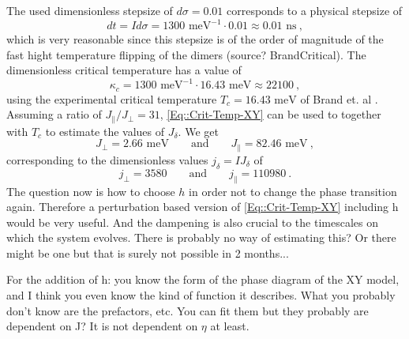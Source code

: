 	The used dimensionless stepsize of $d\sigma = 0.01$ corresponds to a physical stepsize of 
	\begin{equation}
		dt = I d \sigma =	1300 \text{ meV}^{-1} \cdot 0.01 \approx 0.01 \text{ ns}~,	
	\end{equation}
	which is very reasonable since this stepsize is of the order of magnitude of the fast hight temperature flipping of the dimers (source? BrandCritical). The dimensionless critical temperature has a value of
	\begin{equation}
		\kappa_c =	1300 \text{ meV}^{-1} \cdot 16.43 \text{ meV} \approx 22100~,
	\end{equation}
	using the experimental critical temperature $T_c =	16.43 \text{ meV}$ of Brand et. al \cite{brand2023dimer}.
	Assuming a ratio of $J_\parallel /	J_\perp =	31$, \autoref{Eq::Crit-Temp-XY} can be used to together with $T_c$ to estimate the values of $J_\delta$. We get
	\begin{equation}
		J_\perp =	2.66 \text{ meV} \qquad \text{and} \qquad J_\parallel = 82.46 \text{ meV}~,	
	\end{equation}
	corresponding to the dimensionless values $j_\delta =	I J_\delta$ of
	\begin{equation}
		j_\perp =	3580 \qquad \text{and} \qquad j_\parallel =	110980~.
	\end{equation}
	The question now is how to choose $h$ in order not to change the phase transition again. Therefore a perturbation based version of \autoref{Eq::Crit-Temp-XY} including h would be very useful. And the dampening is also crucial to the timescales on which the system evolves. There is probably no way of estimating this? Or there might be one but that is surely not possible in 2 months...
	
	For the addition of h: you know the form of the phase diagram of the XY model, and I think you even know the kind of function it describes. What you probably don't know are the prefactors, etc. You can fit them but they probably are dependent on J? It is not dependent on $\eta$ at least. \\
	
